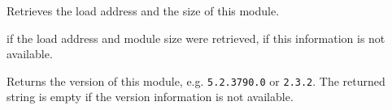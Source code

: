 
Retrieves the load address and the size of this module.





\true if the load address and module size were retrieved, \false if this
information is not available.


\label{wxdynamiclibrarygetversion}


Returns the version of this module, e.g. \texttt{5.2.3790.0} or 
\texttt{2.3.2}. The returned string is empty if the version information is not
available.

